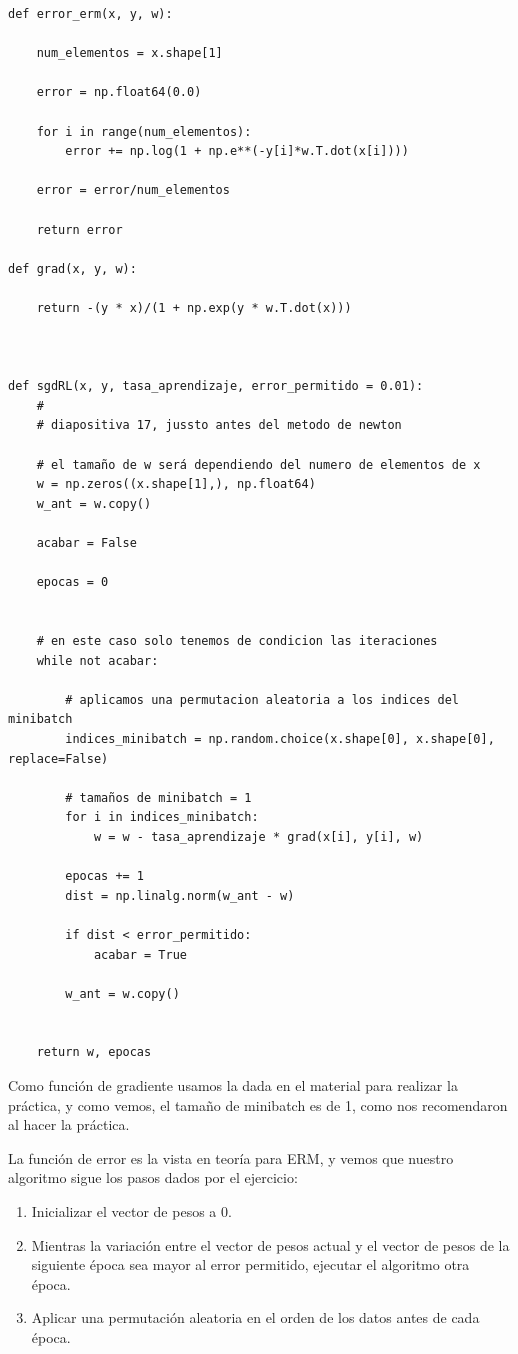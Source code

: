 \documentclass[12pt, spanish]{article}
\begin{document}
\begin{lstlisting}
def error_erm(x, y, w):

	num_elementos = x.shape[1]

	error = np.float64(0.0)

	for i in range(num_elementos):
		error += np.log(1 + np.e**(-y[i]*w.T.dot(x[i])))

	error = error/num_elementos

	return error

def grad(x, y, w):

	return -(y * x)/(1 + np.exp(y * w.T.dot(x)))



def sgdRL(x, y, tasa_aprendizaje, error_permitido = 0.01):
    #
	# diapositiva 17, jussto antes del metodo de newton

	# el tamaño de w será dependiendo del numero de elementos de x
	w = np.zeros((x.shape[1],), np.float64)
	w_ant = w.copy()

	acabar = False

	epocas = 0


	# en este caso solo tenemos de condicion las iteraciones
	while not acabar:

		# aplicamos una permutacion aleatoria a los indices del minibatch
		indices_minibatch = np.random.choice(x.shape[0], x.shape[0], replace=False)

		# tamaños de minibatch = 1
		for i in indices_minibatch:
			w = w - tasa_aprendizaje * grad(x[i], y[i], w)

		epocas += 1
		dist = np.linalg.norm(w_ant - w)

		if dist < error_permitido:
			acabar = True

		w_ant = w.copy()


	return w, epocas
\end{lstlisting}

Como función de gradiente usamos la dada en el material para realizar la práctica, y como vemos, el tamaño de minibatch es de 1, como nos recomendaron al hacer la práctica.

La función de error es la vista en teoría para ERM, y vemos que nuestro algoritmo sigue los pasos dados por el ejercicio:

\begin{enumerate}
	\item Inicializar el vector de pesos a 0.
	\item Mientras la variación entre el vector de pesos actual y el vector de pesos de la siguiente época sea mayor al error permitido, ejecutar el algoritmo otra época.
	\item Aplicar una permutación aleatoria en el orden de los datos antes de cada época.
\end{enumerate}
\end{document}
